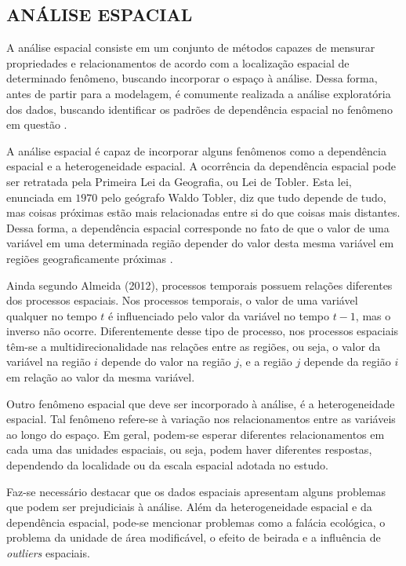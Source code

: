 \documentclass[12pt,a4paper]{article}
\begin{document}
\subsection{ANÁLISE ESPACIAL}  
	
A análise espacial consiste em um conjunto de métodos capazes de mensurar propriedades e relacionamentos de acordo com a localização espacial de determinado fenômeno, buscando incorporar o espaço à análise. Dessa forma, antes de partir para a modelagem, é comumente  realizada a análise exploratória dos dados, buscando identificar os padrões de dependência espacial no fenômeno em questão \cite{camara04}.

A análise espacial é capaz de incorporar alguns fenômenos como a dependência espacial e a heterogeneidade espacial. A ocorrência da dependência espacial pode ser retratada pela Primeira Lei da Geografia, ou Lei de Tobler. Esta lei, enunciada em $1970$ pelo geógrafo Waldo Tobler, diz que tudo depende de tudo, mas coisas próximas estão mais relacionadas entre si do que coisas mais distantes. Dessa forma, a dependência espacial corresponde no fato de que o valor de uma variável em uma determinada região depender do valor desta mesma variável em regiões geograficamente próximas \cite{almeida12_2}.
	
Ainda segundo Almeida (2012), processos temporais possuem relações diferentes dos processos espaciais. Nos processos temporais, o valor de uma variável qualquer no tempo $t$ é influenciado pelo valor da variável no tempo $t-1$, mas o inverso não ocorre. Diferentemente desse tipo de processo, nos  processos espaciais têm-se a multidirecionalidade nas relações entre as regiões, ou seja, o valor da variável na região $i$ depende do valor na região $j$, e a região $j$ depende da região $i$ em relação ao valor da mesma variável.
	
	
Outro fenômeno espacial que deve ser incorporado à análise, é a heterogeneidade espacial. Tal fenômeno refere-se à variação nos relacionamentos entre as variáveis ao longo do espaço. Em geral, podem-se esperar diferentes relacionamentos em cada uma das unidades espaciais, ou seja, podem haver diferentes respostas, dependendo da localidade ou da escala espacial adotada no estudo. 
	
Faz-se necessário destacar que os dados espaciais apresentam alguns problemas que podem ser prejudiciais à análise. Além da heterogeneidade espacial e da dependência espacial, pode-se mencionar problemas como a falácia ecológica, o problema da unidade de área modificável, o efeito de beirada e a influência de \textit{outliers} espaciais. 
	
\end{document}
